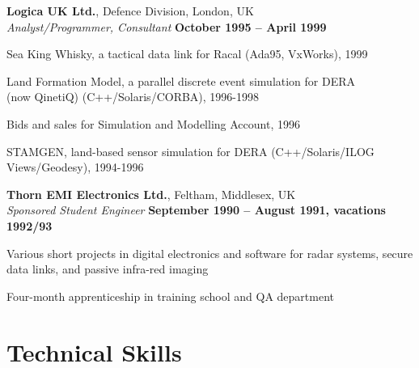 \documentclass[line]{resume}
\begin{document}
\begin{resume}
    \textbf{Logica UK Ltd.}, Defence Division, London, UK \vspace{2mm}\\\vspace{1mm}%
    \textsl{Analyst/Programmer, Consultant} \hfill \textbf{October 1995 -- April 1999}\vspace{-3mm}\\\vspace{-1mm}%
    \begin{list2}
        \item Sea King Whisky, a tactical data link for Racal (Ada95, VxWorks), 1999
        \item Land Formation Model, a parallel discrete event simulation for DERA\\(now QinetiQ) (C++/Solaris/CORBA), 1996-1998
        \item Bids and sales for Simulation and Modelling Account, 1996
        \item STAMGEN, land-based sensor simulation for DERA (C++/Solaris/ILOG Views/Geodesy), 1994-1996
    \end{list2}\vspace{-1.5mm}

    \textbf{Thorn EMI Electronics Ltd.}, Feltham, Middlesex, UK \vspace{2mm}\\\vspace{1mm}%
    \textsl{Sponsored Student Engineer} \hfill \textbf{September 1990 -- August 1991, vacations 1992/93}\vspace{-3mm}\\\vspace{-1mm}%
    \begin{list2}
        \item Various short projects in digital electronics and software for radar systems, 
                  secure data links, and passive infra-red imaging
        \item Four-month apprenticeship in training school and QA department
    \end{list2}\vspace{-1.5mm}


    \section{\mysidestyle Technical Skills} 


\end{resume}
\end{document}
